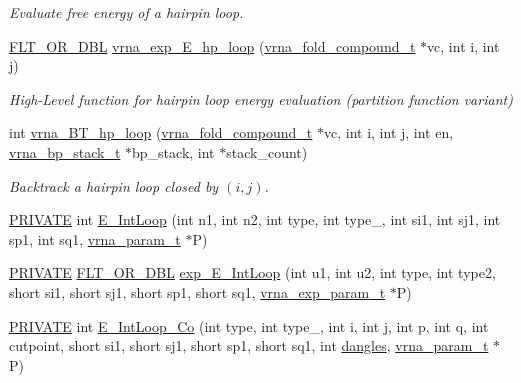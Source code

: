 \begin{DoxyCompactItemize}
\begin{DoxyCompactList}\small\item\em Evaluate free energy of a hairpin loop. \end{DoxyCompactList}\item 
\mbox{\hyperlink{group__data__structures_ga31125aeace516926bf7f251f759b6126}{F\+L\+T\+\_\+\+O\+R\+\_\+\+D\+BL}} \mbox{\hyperlink{group__loops_gac9f49b31d3ec1d9040798b05506c71da}{vrna\+\_\+exp\+\_\+\+E\+\_\+hp\+\_\+loop}} (\mbox{\hyperlink{group__fold__compound_ga1b0cef17fd40466cef5968eaeeff6166}{vrna\+\_\+fold\+\_\+compound\+\_\+t}} $\ast$vc, int i, int j)
\begin{DoxyCompactList}\small\item\em High-\/\+Level function for hairpin loop energy evaluation (partition function variant) \end{DoxyCompactList}\item 
int \mbox{\hyperlink{group__loops_ga6c4ba14d24f716d0ca9021771357e903}{vrna\+\_\+\+B\+T\+\_\+hp\+\_\+loop}} (\mbox{\hyperlink{group__fold__compound_ga1b0cef17fd40466cef5968eaeeff6166}{vrna\+\_\+fold\+\_\+compound\+\_\+t}} $\ast$vc, int i, int j, int en, \mbox{\hyperlink{group__data__structures_gaa651bda42e7692f08cb603cd6834b0ee}{vrna\+\_\+bp\+\_\+stack\+\_\+t}} $\ast$bp\+\_\+stack, int $\ast$stack\+\_\+count)
\begin{DoxyCompactList}\small\item\em Backtrack a hairpin loop closed by $ (i,j) $. \end{DoxyCompactList}\item 
\mbox{\hyperlink{group__utils_ga5e151c615eda34903514212f05a5ccf8}{P\+R\+I\+V\+A\+TE}} int \mbox{\hyperlink{group__loops_gaafbc187b7f78e8e82afb77dd6f3b8fc5}{E\+\_\+\+Int\+Loop}} (int n1, int n2, int type, int type\+\_, int si1, int sj1, int sp1, int sq1, \mbox{\hyperlink{group__energy__parameters_ga8a69ca7d787e4fd6079914f5343a1f35}{vrna\+\_\+param\+\_\+t}} $\ast$P)
\item 
\mbox{\hyperlink{group__utils_ga5e151c615eda34903514212f05a5ccf8}{P\+R\+I\+V\+A\+TE}} \mbox{\hyperlink{group__data__structures_ga31125aeace516926bf7f251f759b6126}{F\+L\+T\+\_\+\+O\+R\+\_\+\+D\+BL}} \mbox{\hyperlink{group__loops_ga95de54d8a2a17645a95e0f34e189d9c9}{exp\+\_\+\+E\+\_\+\+Int\+Loop}} (int u1, int u2, int type, int type2, short si1, short sj1, short sp1, short sq1, \mbox{\hyperlink{group__energy__parameters_ga01d8b92fe734df8d79a6169482c7d8d8}{vrna\+\_\+exp\+\_\+param\+\_\+t}} $\ast$P)
\item 
\mbox{\hyperlink{group__utils_ga5e151c615eda34903514212f05a5ccf8}{P\+R\+I\+V\+A\+TE}} int \mbox{\hyperlink{group__loops_ga2d2e4f3f3448c9060763dac6c0c489f0}{E\+\_\+\+Int\+Loop\+\_\+\+Co}} (int type, int type\+\_, int i, int j, int p, int q, int cutpoint, short si1, short sj1, short sp1, short sq1, int \mbox{\hyperlink{group__model__details_ga72b511ed1201f7e23ec437e468790d74}{dangles}}, \mbox{\hyperlink{group__energy__parameters_ga8a69ca7d787e4fd6079914f5343a1f35}{vrna\+\_\+param\+\_\+t}} $\ast$P)

\end{DoxyCompactItemize}
